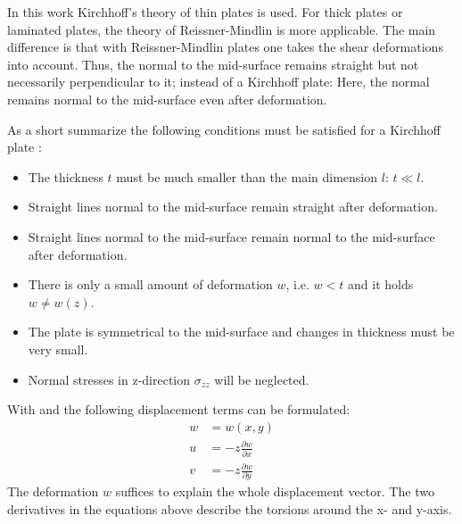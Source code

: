   In this work Kirchhoff's theory of thin plates is used. For thick plates or laminated plates, the theory of Reissner-Mindlin is more applicable. The main difference is that with Reissner-Mindlin plates one takes the shear deformations into account. Thus, the normal to the mid-surface remains straight but not necessarily perpendicular to it; instead of a Kirchhoff plate: Here, the normal remains normal to the mid-surface even after deformation.
  
  As a short summarize the following conditions must be satisfied for a Kirchhoff plate \cite{steinke2005finite}:
  \begin{itemize}
  	\item The thickness $t$ must be much smaller than the main dimension $l$: $t \ll l$.
  	\item Straight lines normal to the mid-surface remain straight after deformation.
  	\item Straight lines normal to the mid-surface remain normal to the mid-surface after deformation.
  	\item There is only a small amount of deformation $w$, i.e. $w < t$ and it holds $w \ne w(z)$.
  	\item The plate is symmetrical to the mid-surface and changes in thickness must be very small.
  	\item Normal stresses in z-direction $\sigma_{zz}$ will be neglected.
  \end{itemize}
  
  With \cite{klein2013fem} and \cite{steinke2005finite} the following displacement terms can be formulated:
  \begin{align}
  w &= w(x,y) \\
  u &= -z \frac{\partial w}{\partial x}\\
  v &= -z \frac{\partial w}{\partial y}
  \end{align}
  The deformation $w$ suffices to explain the whole displacement vector. The two derivatives in the equations above describe the torsions around the x- and y-axis.

